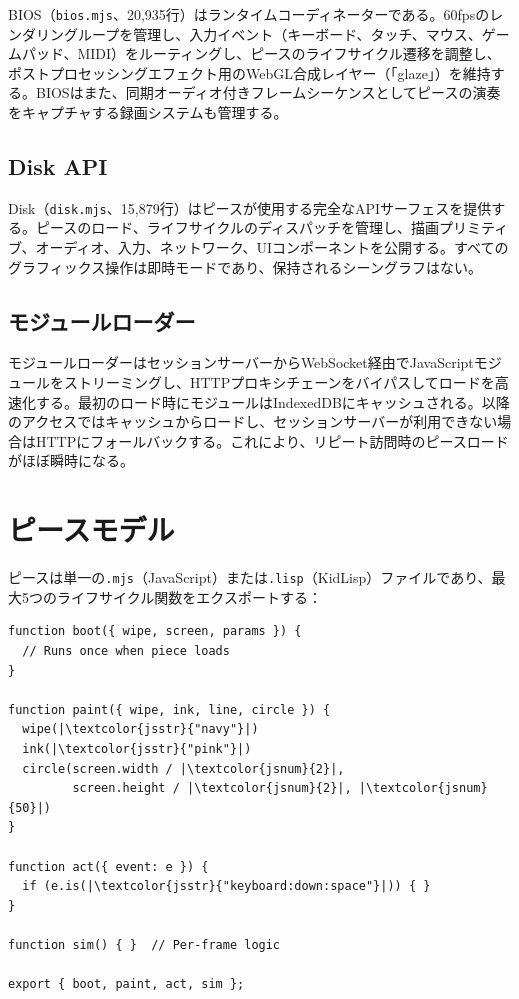 \documentclass[10pt,letterpaper,twocolumn]{article}
\begin{document}
BIOS（\texttt{bios.mjs}、20,935行）はランタイムコーディネーターである。60fpsのレンダリングループを管理し、入力イベント（キーボード、タッチ、マウス、ゲームパッド、MIDI）をルーティングし、ピースのライフサイクル遷移を調整し、ポストプロセッシングエフェクト用のWebGL合成レイヤー（「glaze」）を維持する。BIOSはまた、同期オーディオ付きフレームシーケンスとしてピースの演奏をキャプチャする録画システムも管理する。

\subsection{Disk API}

Disk（\texttt{disk.mjs}、15,879行）はピースが使用する完全なAPIサーフェスを提供する。ピースのロード、ライフサイクルのディスパッチを管理し、描画プリミティブ、オーディオ、入力、ネットワーク、UIコンポーネントを公開する。すべてのグラフィックス操作は即時モードであり、保持されるシーングラフはない。

\subsection{モジュールローダー}

モジュールローダーはセッションサーバーからWebSocket経由でJavaScriptモジュールをストリーミングし、HTTPプロキシチェーンをバイパスしてロードを高速化する。最初のロード時にモジュールはIndexedDBにキャッシュされる。以降のアクセスではキャッシュからロードし、セッションサーバーが利用できない場合はHTTPにフォールバックする。これにより、リピート訪問時のピースロードがほぼ瞬時になる。


\section{ピースモデル}
\label{sec:pieces}

ピースは単一の\texttt{.mjs}（JavaScript）または\texttt{.lisp}（KidLisp）ファイルであり、最大5つのライフサイクル関数をエクスポートする：

\begin{lstlisting}[style=acjsstyle]
function boot({ wipe, screen, params }) {
  // Runs once when piece loads
}

function paint({ wipe, ink, line, circle }) {
  wipe(|\textcolor{jsstr}{"navy"}|)
  ink(|\textcolor{jsstr}{"pink"}|)
  circle(screen.width / |\textcolor{jsnum}{2}|,
         screen.height / |\textcolor{jsnum}{2}|, |\textcolor{jsnum}{50}|)
}

function act({ event: e }) {
  if (e.is(|\textcolor{jsstr}{"keyboard:down:space"}|)) { }
}

function sim() { }  // Per-frame logic

export { boot, paint, act, sim };
\end{lstlisting}
\end{document}
